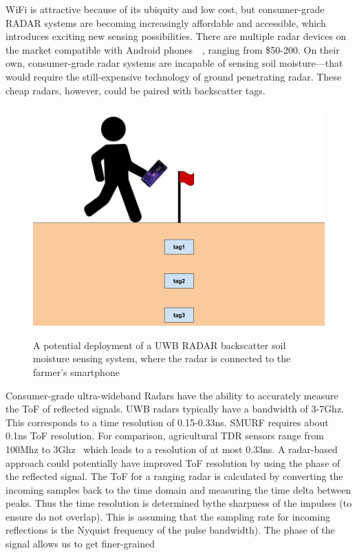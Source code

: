 \documentclass[12pt]{article}
\begin{document}
WiFi is attractive because of its ubiquity and low cost, but
consumer-grade RADAR systems are becoming increasingly affordable and
accessible, which introduces exciting new sensing possibilities. There
are multiple radar devices on the market compatible with Android
phones~\cite{walabot}~\cite{omnipresense}, ranging from \$50-200. On their own,
consumer-grade radar systems are incapable of sensing soil
moisture---that would require the still-expensive technology of ground
penetrating radar. These cheap radars, however, could be paired with
backscatter tags.

\begin{figure}[h!]
  \centering
  \includegraphics[scale=0.4]{soil_moisture_diagram.png}\\
  \caption{A potential deployment of a UWB RADAR backscatter soil
    moisture sensing system, where the radar is connected to the
    farmer's smartphone}
\end{figure}

Consumer-grade ultra-wideband Radars have the ability to accurately
measure the ToF of reflected signals. UWB radars typically have a
bandwidth of 3-7Ghz. This corresponds to a time resolution of
0.15-0.33ns. SMURF requires about 0.1ns ToF resolution. For
comparison, agricultural TDR sensors range from 100Mhz to
3Ghz~\cite{Pelletier2012} which leads to a resolution of at most
0.33ns. A radar-based approach could potentially have improved ToF
resolution by using the phase of the reflected signal. The ToF for a
ranging radar is calculated by converting the incoming samples back to
the time domain and measuring the time delta between peaks. Thus the
time resolution is determined bythe sharpness of the impulses (to
ensure do not overlap). This is assuming that the sampling rate for
incoming reflections is the Nyquist frequency of the pulse
bandwidth). The phase of the signal allows us to get finer-grained
\end{document}
